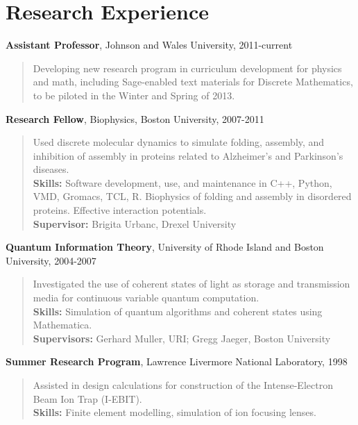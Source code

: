 \documentclass[letterpaper]{article}
\renewenvironment{itemize}{
  \begin{list}{}{
    \setlength{\leftmargin}{1em}
  }
}{
  \end{list}
}
\begin{document}
\section*{Research Experience}
\begin{itemize}
	\item \textbf{Assistant Professor}, Johnson and Wales University, 2011-current 
\vspace{-0.5em}
\begin{quote}Developing new research program in curriculum development for physics and math, including Sage-enabled text materials for Discrete Mathematics, to be piloted in the Winter and Spring of 2013.
\end{quote}
	\item \textbf{Research Fellow}, Biophysics, Boston University, 2007-2011\vspace{-0.5em}
\begin{quote}Used discrete molecular dynamics to simulate folding, assembly,
	and inhibition of assembly in proteins related to Alzheimer's and
	Parkinson's diseases.  \\
	\textbf{Skills:} Software development, use, and maintenance in C++, Python, VMD, Gromacs, TCL, R.  Biophysics of folding and assembly in disordered proteins.  Effective interaction potentials.\\
	\textbf{Supervisor:} Brigita Urbanc, Drexel University 
\end{quote}
	\item \textbf{Quantum Information Theory}, University of Rhode Island and Boston University, 2004-2007
\vspace{-0.5em}
\begin{quote}
	Investigated the use of coherent states of light as storage and transmission media for continuous variable quantum computation.\\
	\textbf{Skills:} Simulation of quantum algorithms and coherent states using Mathematica.\\
	\textbf{Supervisors:} Gerhard Muller, URI; Gregg Jaeger, Boston University 		
\end{quote}
	\item \textbf{Summer Research Program}, Lawrence Livermore National Laboratory, 1998
\begin{quote}
\vspace{-0.5em}
	Assisted in design calculations for construction of the Intense-Electron Beam Ion Trap (I-EBIT).  \\
	\textbf{Skills:} Finite element modelling, simulation of ion focusing lenses.  \\

\end{quote}
\end{itemize}
\end{document}
